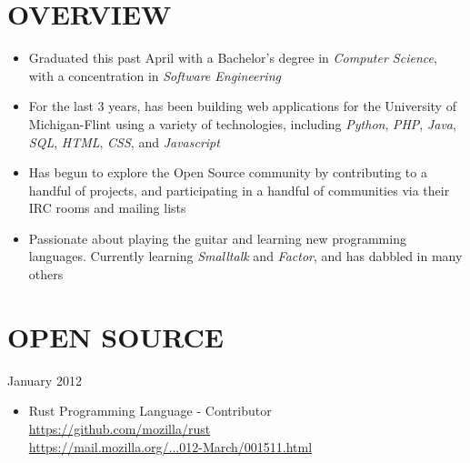 \documentclass[line,margin]{res}
\begin{document}

\address{1450 Schafer Drive, Burton, MI 48509}
\address{pwoolcoc@gmail.com\ -\ (810) 412-8642}


\begin{resume}


\section{OVERVIEW}
    \begin{itemize}
        \item Graduated this past April with a Bachelor's degree in
              {\sl Computer Science}, with a concentration in
              {\sl Software Engineering}
        \item For the last 3 years, has been building web applications
              for the University of Michigan-Flint using a variety of
              technologies, including {\sl Python}, {\sl PHP}, {\sl Java},
              {\sl SQL}, {\sl HTML}, {\sl CSS}, and {\sl Javascript}
        \item Has begun to explore the Open Source community by contributing to
              a handful of projects, and participating in a handful
              of communities via their IRC rooms and mailing lists
        \item Passionate about playing the guitar and learning new programming
              languages. Currently learning {\sl Smalltalk} and {\sl Factor},
              and has dabbled in many others
    \end{itemize}



\section{OPEN SOURCE} \hfill January 2012
    \begin{itemize}
        \item Rust Programming Language - Contributor \\
              \href{https://github.com/mozilla/rust}{https://github.com/mozilla/rust} \\
              \href{https://mail.mozilla.org/pipermail/rust-dev/2012-March/001511.html}{https://mail.mozilla.org/...012-March/001511.html}
    \end{itemize}


\end{resume}
\end{document}
